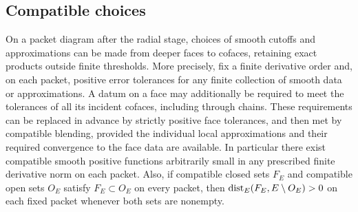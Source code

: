 \subsection{Compatible choices}

\begin{lemma}\label{packet:approximation}
On a packet diagram after the radial stage, choices of smooth cutoffs and approximations can
be made from deeper faces to cofaces, retaining exact products outside
finite thresholds.  More precisely, fix a finite derivative order and,
on each packet, positive error tolerances for any finite collection of
smooth data or approximations.  A datum on a face may additionally be
required to meet the tolerances of all its incident cofaces, including
through chains.  These requirements can be replaced in advance by
strictly positive face tolerances, and then met by compatible blending,
provided the individual local approximations and their required
convergence to the face data are available.
In particular there exist compatible smooth positive functions
arbitrarily small in any prescribed finite derivative norm on each
packet.  Also, if compatible closed sets $F_E$ and compatible open sets
$O_E$ satisfy $F_E\subset O_E$ on every packet, then
$\operatorname{dist}_E(F_E,E\setminus O_E)>0$ on each fixed packet whenever both
sets are nonempty.
\end{lemma}

